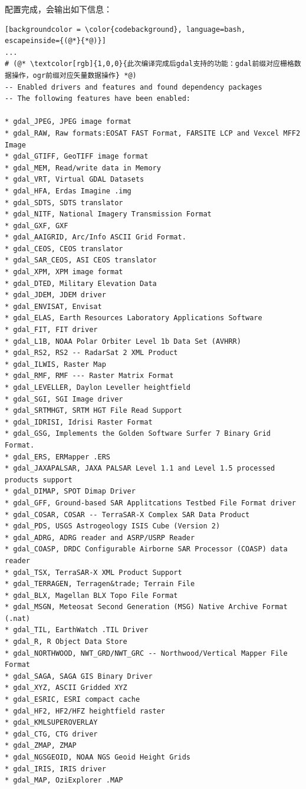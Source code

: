配置完成，会输出如下信息：

\begin{lstlisting}[backgroundcolor = \color{codebackground}, language=bash, escapeinside={(@*}{*@)}]
...
# (@* \textcolor[rgb]{1,0,0}{此次编译完成后gdal支持的功能：gdal前缀对应栅格数据操作，ogr前缀对应矢量数据操作} *@)
-- Enabled drivers and features and found dependency packages
-- The following features have been enabled:

* gdal_JPEG, JPEG image format
* gdal_RAW, Raw formats:EOSAT FAST Format, FARSITE LCP and Vexcel MFF2 Image
* gdal_GTIFF, GeoTIFF image format
* gdal_MEM, Read/write data in Memory
* gdal_VRT, Virtual GDAL Datasets
* gdal_HFA, Erdas Imagine .img
* gdal_SDTS, SDTS translator
* gdal_NITF, National Imagery Transmission Format
* gdal_GXF, GXF
* gdal_AAIGRID, Arc/Info ASCII Grid Format.
* gdal_CEOS, CEOS translator
* gdal_SAR_CEOS, ASI CEOS translator
* gdal_XPM, XPM image format
* gdal_DTED, Military Elevation Data
* gdal_JDEM, JDEM driver
* gdal_ENVISAT, Envisat
* gdal_ELAS, Earth Resources Laboratory Applications Software
* gdal_FIT, FIT driver
* gdal_L1B, NOAA Polar Orbiter Level 1b Data Set (AVHRR)
* gdal_RS2, RS2 -- RadarSat 2 XML Product
* gdal_ILWIS, Raster Map
* gdal_RMF, RMF --- Raster Matrix Format
* gdal_LEVELLER, Daylon Leveller heightfield
* gdal_SGI, SGI Image driver
* gdal_SRTMHGT, SRTM HGT File Read Support
* gdal_IDRISI, Idrisi Raster Format
* gdal_GSG, Implements the Golden Software Surfer 7 Binary Grid Format.
* gdal_ERS, ERMapper .ERS
* gdal_JAXAPALSAR, JAXA PALSAR Level 1.1 and Level 1.5 processed products support
* gdal_DIMAP, SPOT Dimap Driver
* gdal_GFF, Ground-based SAR Applitcations Testbed File Format driver
* gdal_COSAR, COSAR -- TerraSAR-X Complex SAR Data Product
* gdal_PDS, USGS Astrogeology ISIS Cube (Version 2)
* gdal_ADRG, ADRG reader and ASRP/USRP Reader
* gdal_COASP, DRDC Configurable Airborne SAR Processor (COASP) data reader
* gdal_TSX, TerraSAR-X XML Product Support
* gdal_TERRAGEN, Terragen&trade; Terrain File
* gdal_BLX, Magellan BLX Topo File Format
* gdal_MSGN, Meteosat Second Generation (MSG) Native Archive Format (.nat)
* gdal_TIL, EarthWatch .TIL Driver
* gdal_R, R Object Data Store
* gdal_NORTHWOOD, NWT_GRD/NWT_GRC -- Northwood/Vertical Mapper File Format
* gdal_SAGA, SAGA GIS Binary Driver
* gdal_XYZ, ASCII Gridded XYZ
* gdal_ESRIC, ESRI compact cache
* gdal_HF2, HF2/HFZ heightfield raster
* gdal_KMLSUPEROVERLAY
* gdal_CTG, CTG driver
* gdal_ZMAP, ZMAP
* gdal_NGSGEOID, NOAA NGS Geoid Height Grids
* gdal_IRIS, IRIS driver
* gdal_MAP, OziExplorer .MAP

\end{lstlisting}
